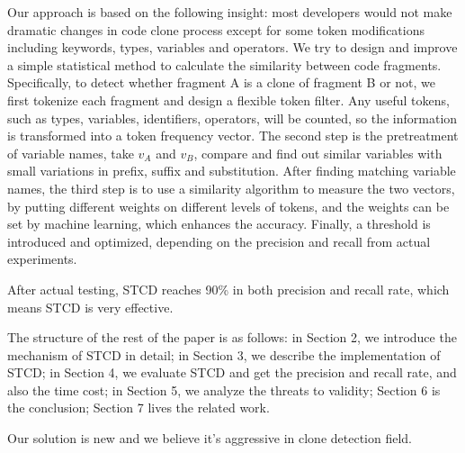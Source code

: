 \documentclass[../main.tex]{subfiles}
\begin{document}
Our approach is based on the following insight: most developers would not make dramatic changes in code clone process except for some token modifications including keywords, types, variables and operators. 
We try to design and improve a simple statistical method to calculate the similarity between code fragments. 
Specifically, to detect whether fragment A is a clone of fragment B or not, we first tokenize each fragment and design a flexible token filter. Any useful tokens, such as types, variables, identifiers, operators, will be counted, so the information is transformed into a token frequency vector. 
The second step is the pretreatment of variable names, take $v_A$ and $v_B$, compare and find out similar variables with small variations in prefix, suffix and substitution. 
After finding matching variable names, the third step is to use a similarity algorithm to measure the two vectors, by putting different weights on different levels of tokens, and the weights can be set by machine learning, which enhances the accuracy.
Finally, a threshold is introduced and optimized, depending on the precision and recall from actual experiments.

After actual testing, STCD reaches 90\% in both precision and recall rate, which means STCD is very effective.

The structure of the rest of the paper is as follows: in Section 2, we introduce the mechanism of STCD in detail; in Section 3, we describe the implementation of STCD; in Section 4, we evaluate STCD and get the precision and recall rate, and also the time cost; in Section 5, we analyze the threats to validity; Section 6 is the conclusion; Section 7 lives the related work. 

%

Our solution is new and we believe it's aggressive in clone detection field.
\end{document}
